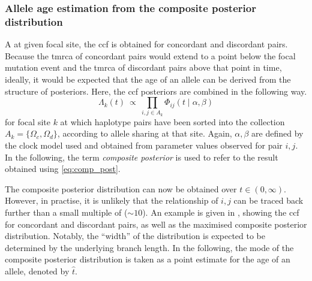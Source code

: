 %


%
\subsubsection{Allele age estimation from the composite posterior distribution}\label{sec:comp_post_detail}
%


A at given focal site, the \gls{ccf} is obtained for concordant and discordant pairs.
Because the \gls{tmrca} of concordant pairs would extend to a point below the focal mutation event and the \gls{tmrca} of discordant pairs above that point in time, ideally, it would be expected that the age of an allele can be derived from the structure of posteriors.
Here, the \gls{ccf} posteriors are combined in the following way.
\begin{equation}\label{eq:comp_post}
	\Lambda_k(t)~\propto~\prod_{i,j \in A_k} \Phi_{ij}(t\mid\alpha,\beta)
\end{equation}
for focal site $k$ at which haplotype pairs have been sorted into the collection ${A_k=\{\Omega_c,\Omega_d\}}$, according to allele sharing at that site.
Again, ${\alpha,\beta}$ are defined by the clock model used and obtained from parameter values observed for pair ${i,j}$.
In the following, the term \emph{composite posterior} is used to refer to the result obtained using \cref{eq:comp_post}.

%

%

The composite posterior distribution can now be obtained over ${t \in (0,\infty)}$.
However, in practise, it is unlikely that the relationship of ${i,j}$ can be traced back further than a small multiple of \Ne (\eg $\sim 10$).
An example is given in , showing the \gls{ccf} for concordant and discordant pairs, as well as the maximised composite posterior distribution.
Notably, the ``width'' of the distribution is expected to be determined by the underlying branch length.
In the following, the mode of the composite posterior distribution is taken as a point estimate for the age of an allele, denoted by $\hat{t}$.



